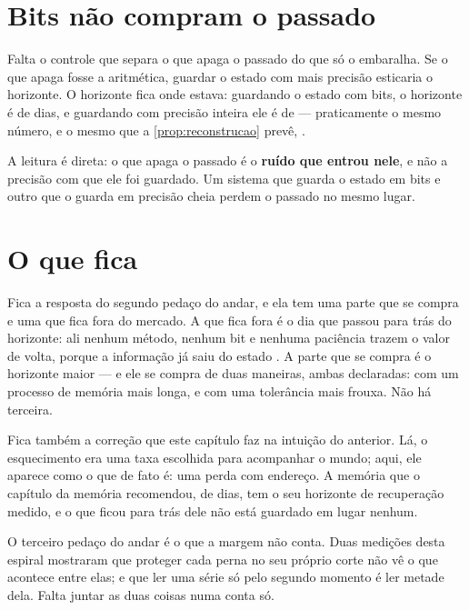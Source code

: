 \section{Bits não compram o passado}

Falta o controle que separa o que apaga o passado do que só o embaralha. Se o que apaga fosse a
aritmética, guardar o estado com mais precisão esticaria o horizonte. O horizonte fica onde estava: guardando o estado
com \numApagadoBitsMenor{} bits, o horizonte é de \numApagadoHorizonteDeBits{} dias, e guardando com
precisão inteira ele é de \numApagadoHorizonteSemBits{} --- praticamente o mesmo número, e o mesmo
que a \cref{prop:reconstrucao} prevê, \numApagadoHorizonteDaFormula{}.

A leitura é direta: o que apaga o passado é o \textbf{ruído que entrou nele}, e não a precisão com que
ele foi guardado. Um sistema que guarda o estado em \numApagadoBitsMenor{} bits e outro que o guarda em precisão cheia
perdem o passado no mesmo lugar.

\section{O que fica}

Fica a resposta do segundo pedaço do andar, e ela tem uma parte que se compra e uma que fica fora do
mercado. A que fica fora é o dia que passou para trás do horizonte: ali nenhum método, nenhum bit e
nenhuma paciência trazem o valor de volta, porque a informação já saiu do estado \cite{cover2006elements}. A parte que se compra é
o horizonte maior --- e ele se compra de duas maneiras, ambas declaradas: com um processo de memória
mais longa, e com uma tolerância mais frouxa. Não há terceira.

Fica também a correção que este capítulo faz na intuição do anterior. Lá, o esquecimento era uma
taxa escolhida para acompanhar o mundo; aqui, ele aparece como o que de fato é: uma perda com
endereço. A memória que o capítulo da memória recomendou, de \numEsquecimentoMelhorMemoria{} dias, tem o seu horizonte de
recuperação medido, e o que ficou para trás dele não está guardado em lugar nenhum.

O terceiro pedaço do andar é o que a margem não conta. Duas medições desta espiral mostraram que proteger
cada perna no seu próprio corte não vê o que acontece entre elas; e que ler uma série só pelo
segundo momento é ler metade dela. Falta juntar as duas coisas numa conta só.
